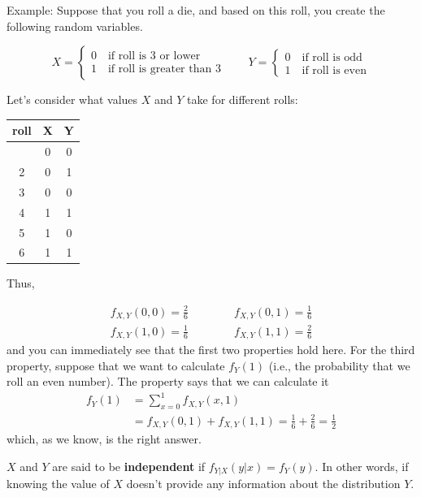 \documentclass[
  letterpaper,
  DIV=11,
  numbers=noendperiod]{scrreprt}
\begin{document}
{Example: }Suppose that you roll a die, and based on this roll, you
create the following random variables.

\[
  X = \begin{cases} 0 \quad \textrm{if roll is 3 or lower} \\
  1 \quad \textrm{if roll is greater than 3} \end{cases} \qquad Y = \begin{cases} 0 \quad \textrm{if roll is odd} \\
  1 \quad \textrm{if roll is even} \end{cases}
\]

Let's consider what values \(X\) and \(Y\) take for different rolls:

\begin{longtable}[]{@{}ccc@{}}
\toprule\noalign{}
\textbf{roll} & \textbf{X} & \textbf{Y} \\
\midrule\noalign{}
\endhead
\bottomrule\noalign{}
\endlastfoot
1 & 0 & 0 \\
2 & 0 & 1 \\
3 & 0 & 0 \\
4 & 1 & 1 \\
5 & 1 & 0 \\
6 & 1 & 1 \\
\end{longtable}

Thus,

\[
\begin{aligned}
  f_{X,Y}(0, 0) = \frac{2}{6} \qquad \qquad f_{X,Y}(0,1) = \frac{1}{6} \\
  f_{X,Y}(1, 0) = \frac{1}{6} \qquad \qquad f_{X,Y}(1,1) = \frac{2}{6}
\end{aligned}
\] and you can immediately see that the first two properties hold here.
For the third property, suppose that we want to calculate \(f_Y(1)\)
(i.e., the probability that we roll an even number). The property says
that we can calculate it \[
  \begin{aligned}
  f_Y(1) &= \sum_{x=0}^1 f_{X,Y}(x,1) \\
  &= f_{X,Y}(0,1) + f_{X,Y}(1,1) = \frac{1}{6} + \frac{2}{6} = \frac{1}{2}
  \end{aligned}
\] which, as we know, is the right answer.

\(X\) and \(Y\) are said to be \textbf{independent} if
\(f_{Y|X}(y|x) = f_Y(y)\). In other words, if knowing the value of \(X\)
doesn't provide any information about the distribution \(Y\).

\end{document}
